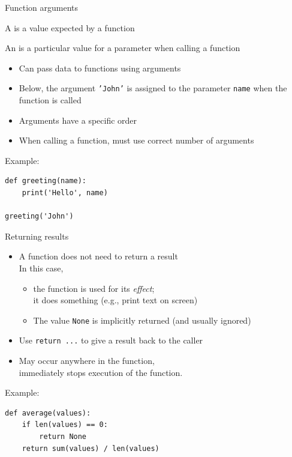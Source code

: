 \documentclass[aspectratio=169,usenames,dvipsnames]{beamer}
\begin{document}
\begin{frame}[fragile]{Function arguments}
    \begin{definition}
        A  is a value expected by a function

        An  is a particular value for a parameter
            when calling a function
    \end{definition}

    \begin{itemize}
        \item Can pass data to functions using arguments
        \item Below, the argument \texttt{'John'} is assigned
            to the parameter \texttt{name} when the function is called
        \item Arguments have a specific order
        \item When calling a function, must use correct number of arguments
    \end{itemize}
Example:
\begin{lstlisting}
def greeting(name):
    print('Hello', name)

greeting('John')
\end{lstlisting}
\end{frame}

\begin{frame}[fragile]{Returning results}
    \begin{itemize}
        \item A function does not need to return a result \\
            In this case,
            \begin{itemize}
                \item the function is used for its \emph{effect};\\
                    it does something (e.g., print text on screen)
                \item The value \texttt{None} is implicitly returned
                        (and usually ignored)
            \end{itemize}
        \item Use \texttt{return ...} to give a result back to the caller
        \item May occur anywhere in the function,\\
                immediately stops execution of the function.
    \end{itemize}

Example:
\begin{lstlisting}
def average(values):
    if len(values) == 0:
        return None
    return sum(values) / len(values)
\end{lstlisting}
\end{frame}
\end{document}
